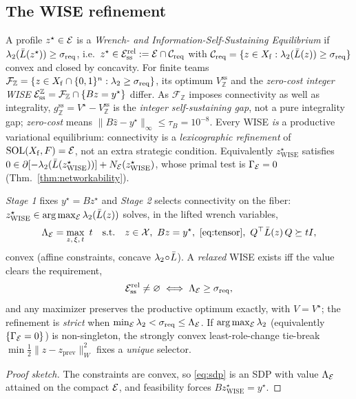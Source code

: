 \subsection{The WISE refinement}
\begin{definition}\label{def:wise}
A profile $z^{\star}\in\mathcal{E}$ is a \emph{Wrench- and Information-Self-Sustaining
Equilibrium} if $\lambda_2(\bar L(z^{\star}))\ge\sigma_{\mathrm{req}}$, i.e.\
$z^{\star}\in\mathcal{E}_{\mathrm{ss}}^{\mathrm{rel}}:=\mathcal{E}\cap\mathcal{C}_{\mathrm{req}}$ with $\mathcal{C}_{\mathrm{req}}=\{z\in X_{\mathrm f}:
\lambda_2(\bar L(z))\ge\sigma_{\mathrm{req}}\}$ convex and closed by concavity. For finite teams
$\mathcal F_{\mathbb Z}=\{z\in X_{\mathrm f}\cap\{0,1\}^{n}:\lambda_2\ge\sigma_{\mathrm{req}}\}$, its
optimum $V_{\mathbb Z}^{\mathrm{ss}}$ and the \emph{zero-cost integer WISE}
$\mathcal{E}_{\mathrm{ss}}^{\mathbb Z}=\mathcal F_{\mathbb Z}\cap\{Bz=y^{\star}\}$ differ. As $\mathcal F_{\mathbb Z}$ imposes connectivity as well as integrality,
$g_{\mathbb Z}^{\mathrm{ss}}=V^{\star}-V_{\mathbb Z}^{\mathrm{ss}}$ is the \emph{integer
self-sustaining gap}, not a pure integrality gap; \emph{zero-cost} means
$\|B\hat z-y^{\star}\|_\infty\le\tau_B=10^{-8}$. Every WISE
\emph{is} a productive variational equilibrium: connectivity is a \emph{lexicographic
refinement} of $\operatorname{SOL}(X_{\mathrm f},F)=\mathcal{E}$, not an extra strategic
condition. Equivalently $z^{\star}_{\mathrm{WISE}}$ satisfies
$0\in\partial[-\lambda_2(\bar L(z^{\star}_{\mathrm{WISE}}))]+N_{\mathcal{E}}
(z^{\star}_{\mathrm{WISE}})$, whose primal test is $\Gamma_{\mathcal{E}}=0$
(Thm.~\ref{thm:networkability}).
\end{definition}

\begin{theorem}\label{thm:existence}
\emph{Stage 1} fixes $y^{\star}=Bz^{\star}$ and \emph{Stage 2} selects connectivity on the
fiber: $z^{\star}_{\mathrm{WISE}}\in\arg\max_{\mathcal{E}}\lambda_2(\bar L(z))$ solves, in the
lifted wrench variables,
\begin{equation}
\LamE=\max_{z,\,\xi,\,t}\ t\quad\text{s.t.}\quad
z\in\mathcal X,\ Bz=y^{\star},\ \eqref{eq:tensor},\ Q^{\top}\Lap(z)\,Q\succeq tI,
\label{eq:sdp}
\end{equation}
convex (affine constraints, concave $\lambda_2\!\circ\!\bar L$). A \emph{relaxed} WISE exists iff
the value clears the requirement,
\begin{equation}
\mathcal{E}_{\mathrm{ss}}^{\mathrm{rel}}\neq\varnothing\iff\Lambda_{\mathcal{E}}\ge\sigma_{\mathrm{req}},
\label{eq:exist}
\end{equation}
and any maximizer preserves the productive optimum exactly, with $V=V^{\star}$; the refinement
is \emph{strict} when $\min_{\mathcal{E}}\lambda_2<\sigma_{\mathrm{req}}\le\Lambda_{\mathcal{E}}$. If $\arg\max_{\mathcal{E}}\lambda_2$ (equivalently $\{\Gamma_{\mathcal{E}}=0\}$) is
non-singleton, the strongly convex least-role-change tie-break
$\min\tfrac12\|z-z_{\mathrm{prev}}\|_W^2$ fixes a \emph{unique} selector.
\end{theorem}
\begin{proof}[Proof sketch]
The constraints are convex, so \eqref{eq:sdp} is an SDP with value $\Lambda_{\mathcal{E}}$ attained on the
compact $\mathcal{E}$, and feasibility forces $Bz^{\star}_{\mathrm{WISE}}=y^{\star}$.
\end{proof}


